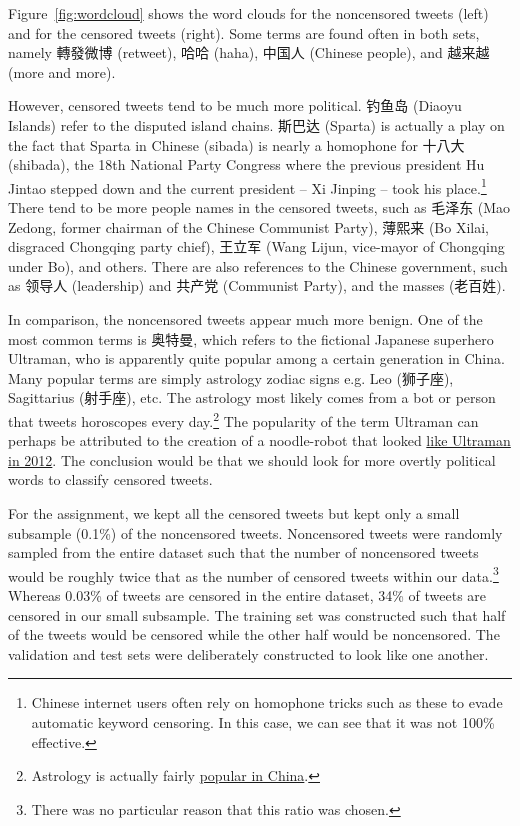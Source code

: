 \documentclass{sig-alternate-05-2015}
\begin{document}
Figure~\ref{fig:wordcloud} shows the word clouds for the noncensored tweets (left) and for the censored tweets (right). Some terms are found often in both sets, namely 轉發微博 (retweet), 哈哈 (haha), 中国人 (Chinese people), and 越来越 (more and more). 

However, censored tweets tend to be much more political. 钓鱼岛 (Diaoyu Islands) refer to the disputed island chains. 斯巴达 (Sparta) is actually a play on the fact that Sparta in Chinese (sibada) is nearly a homophone for 十八大 (shibada), the 18th National Party Congress where the previous president Hu Jintao stepped down and the current president -- Xi Jinping -- took his place.\footnote{Chinese internet users often rely on homophone tricks such as these to evade automatic keyword censoring. In this case, we can see that it was not 100\% effective.} There tend to be more people names in the censored tweets, such as 毛泽东 (Mao Zedong, former chairman of the Chinese Communist Party), 薄熙来 (Bo Xilai, disgraced Chongqing party chief), 王立军 (Wang Lijun, vice-mayor of Chongqing under Bo), and others. There are also references to the Chinese government, such as 领导人 (leadership) and 共产党 (Communist Party), and the masses (老百姓).

In comparison, the noncensored tweets appear much more benign. One of the most common terms is 奥特曼, which refers to the fictional Japanese superhero Ultraman, who is apparently quite popular among a certain generation in China. Many popular terms are simply astrology zodiac signs e.g. Leo (狮子座), Sagittarius (射手座), etc. The astrology most likely comes from a bot or person that tweets horoscopes every day.\footnote{Astrology is actually fairly \href{https://newrepublic.com/article/119500/chinese-astrology-surprising-prominence-horoscopes}{popular in China}.} The popularity of the term Ultraman can perhaps be attributed to the creation of a noodle-robot that looked \href{http://asiasociety.org/blog/asia/video-when-going-gets-tough-superhero-robot-turns-noodle-making}{like Ultraman in 2012}. The conclusion would be that we should look for more overtly political words to classify censored tweets.

For the assignment, we kept all the censored tweets but kept only a small subsample (0.1\%) of the noncensored tweets. Noncensored tweets were randomly sampled from the entire dataset such that the number of noncensored tweets would be roughly twice that as the number of censored tweets within our data.\footnote{There was no particular reason that this ratio was chosen.} Whereas 0.03\% of tweets are censored in the entire dataset, 34\% of tweets are censored in our small subsample. The training set was constructed such that half of the tweets would be censored while the other half would be noncensored. The validation and test sets were deliberately constructed to look like one another. 
\end{document}
